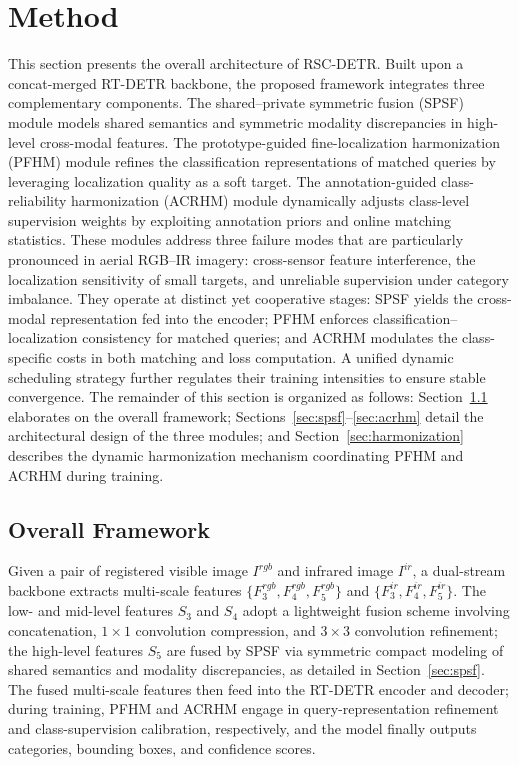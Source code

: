 \documentclass[letterpaper,journal]{IEEEtran}
\begin{document}
\section{Method}
This section presents the overall architecture of RSC-DETR. Built upon a concat-merged RT-DETR backbone, the proposed framework integrates three complementary components. The shared--private symmetric fusion (SPSF) module models shared semantics and symmetric modality discrepancies in high-level cross-modal features. The prototype-guided fine-localization harmonization (PFHM) module refines the classification representations of matched queries by leveraging localization quality as a soft target. The annotation-guided class-reliability harmonization (ACRHM) module dynamically adjusts class-level supervision weights by exploiting annotation priors and online matching statistics. These modules address three failure modes that are particularly pronounced in aerial RGB--IR imagery: cross-sensor feature interference, the localization sensitivity of small targets, and unreliable supervision under category imbalance. They operate at distinct yet cooperative stages: SPSF yields the cross-modal representation fed into the encoder; PFHM enforces classification--localization consistency for matched queries; and ACRHM modulates the class-specific costs in both matching and loss computation. A unified dynamic scheduling strategy further regulates their training intensities to ensure stable convergence. The remainder of this section is organized as follows: Section~\ref{sec:framework} elaborates on the overall framework; Sections~\ref{sec:spsf}--\ref{sec:acrhm} detail the architectural design of the three modules; and Section~\ref{sec:harmonization} describes the dynamic harmonization mechanism coordinating PFHM and ACRHM during training.

\subsection{Overall Framework}
\label{sec:framework}
Given a pair of registered visible image $I^{rgb}$ and infrared image $I^{ir}$, a dual-stream backbone extracts multi-scale features $\{F_3^{rgb},F_4^{rgb},F_5^{rgb}\}$ and $\{F_3^{ir},F_4^{ir},F_5^{ir}\}$. The low- and mid-level features $S_3$ and $S_4$ adopt a lightweight fusion scheme involving concatenation, $1\times1$ convolution compression, and $3\times3$ convolution refinement; the high-level features $S_5$ are fused by SPSF via symmetric compact modeling of shared semantics and modality discrepancies, as detailed in Section~\ref{sec:spsf}. The fused multi-scale features then feed into the RT-DETR encoder and decoder; during training, PFHM and ACRHM engage in query-representation refinement and class-supervision calibration, respectively, and the model finally outputs categories, bounding boxes, and confidence scores.
\end{document}
